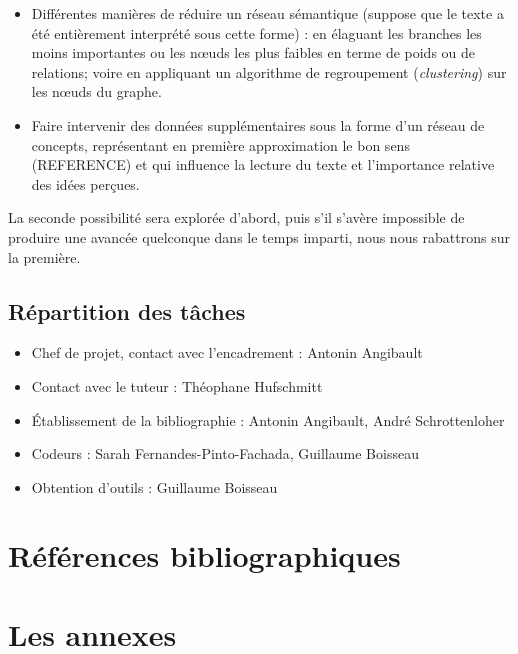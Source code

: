 \documentclass{article}           %
\begin{document}
\begin{itemize}
  \item Différentes manières de réduire un réseau sémantique (suppose que le texte a été entièrement interprété sous cette forme) : en élaguant les branches les moins importantes ou les nœuds les plus faibles en terme de poids ou de relations; voire en appliquant un algorithme de regroupement (\emph{clustering}) sur les nœuds du graphe.
  
  \item Faire intervenir des données supplémentaires sous la forme d'un réseau de concepts, représentant en première approximation le bon sens (REFERENCE) et qui influence la lecture du texte et l'importance relative des idées perçues.
\end{itemize}
La seconde possibilité sera explorée d'abord, puis s'il s'avère impossible de produire une avancée quelconque dans le temps imparti, nous nous rabattrons sur la première.



\subsection{Répartition des tâches}%
\begin{itemize}
	\item Chef de projet, contact avec l'encadrement : Antonin Angibault
	\item Contact avec le tuteur : Théophane Hufschmitt
	\item Établissement de la bibliographie : Antonin Angibault, André Schrottenloher
	\item Codeurs : Sarah Fernandes-Pinto-Fachada, Guillaume Boisseau
	\item Obtention d'outils : Guillaume Boisseau
\end{itemize}


\section{Références bibliographiques}

\nocite{*}
\printbibliography



\appendix
\section{Les annexes}
\end{document}

